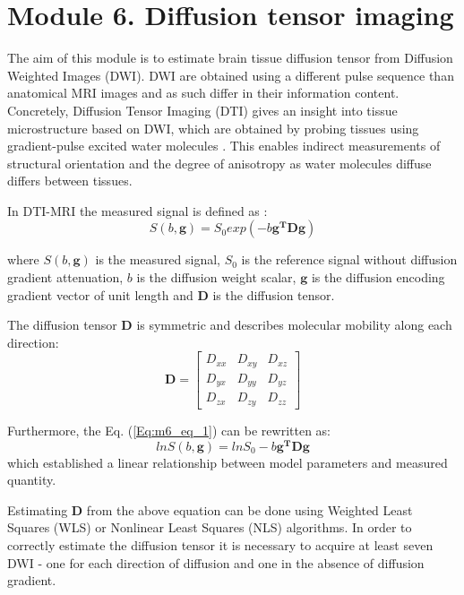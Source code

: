 \section{Module 6. Diffusion tensor imaging}

The aim of this module is to estimate brain tissue diffusion tensor
from Diffusion Weighted Images (DWI). DWI are obtained using a different
pulse sequence than anatomical MRI images and as such differ in their
information content. Concretely, Diffusion Tensor Imaging (DTI) gives
an insight into tissue microstructure based on DWI, which are obtained by probing tissues using gradient-pulse excited water molecules \cite{m6_soares2013}. This enables indirect measurements of structural orientation and the degree of anisotropy as water molecules diffuse differs between tissues.

In DTI-MRI the measured signal is defined as \cite{m6_koay2006b}: 
\begin{equation}
S\left(b,\boldsymbol{g}\right) =  S_{0} exp\left(-b\boldsymbol{g^TDg}\right)
\label{Eq:m6_eq_1}
\end{equation}

where $S\left(b,\boldsymbol{g}\right)$ is the measured signal, $S_{0}$
is the reference signal without diffusion gradient attenuation, $b$
is the diffusion weight scalar, $\boldsymbol{g}$ is the diffusion
encoding gradient vector of unit length and $\boldsymbol{D}$ is the
diffusion tensor.

The diffusion tensor $\boldsymbol{D}$ is symmetric and describes
molecular mobility along each direction: 
\begin{equation}
\boldsymbol{D}=
\begin{bmatrix}
D_{xx} & D_{xy} & D_{xz} \\
D_{yx} & D_{yy} & D_{yz} \\
D_{zx} & D_{zy} & D_{zz} 
\end{bmatrix}
\label{Eq:m6_eq_2}
\end{equation}

Furthermore, the Eq. (\ref{Eq:m6_eq_1}) can be rewritten as: 
\begin{equation}
ln{S\left(b,\boldsymbol{g}\right)} = ln{S_0}-b\boldsymbol{g^TDg}
\label{Eq:dti_eq_3}
\end{equation}
which established a linear relationship between model parameters and measured quantity.

Estimating $\boldsymbol{D}$ from the above equation can be done using
Weighted Least Squares (WLS) or Nonlinear Least Squares (NLS) algorithms.
In order to correctly estimate the diffusion tensor it is necessary
to acquire at least seven DWI - one for each direction of diffusion
and one in the absence of diffusion gradient.

